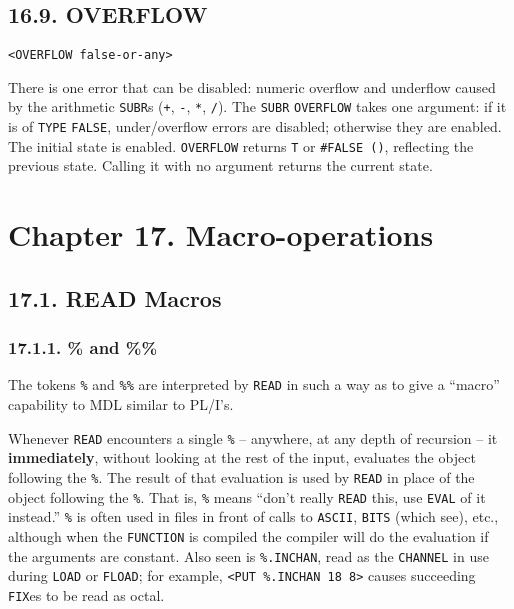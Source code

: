 \documentclass[a4paper,]{article}
\begin{document}
\subsection{16.9. OVERFLOW}\label{overflow}

\begin{verbatim}
<OVERFLOW false-or-any>
\end{verbatim}

 There is one error that can be disabled: numeric overflow and underflow caused by the
arithmetic \texttt{SUBR}s (\texttt{+}\index{\texttt{+}}, \texttt{-}\index{\texttt{-}}, \texttt{*}, \index{\texttt{*}}
\texttt{/}\index{\texttt{/}}). The \texttt{SUBR} \texttt{OVERFLOW} takes one argument: if it is of \texttt{TYPE}
\texttt{FALSE}, under/overflow errors are disabled; otherwise they are enabled. The initial state is enabled.
\texttt{OVERFLOW} returns \texttt{T} or \texttt{\#FALSE\ ()}, reflecting the previous state. Calling it with no argument
returns the current state.

\section{Chapter 17. Macro-operations}\label{chapter-17.-macro-operations}

\subsection{17.1. READ Macros}\label{read-macros}

\subsubsection{17.1.1. \% and \%\%}\label{and}

The tokens \texttt{\%}  and \texttt{\%\%}  are interpreted by
\texttt{READ} in such a way as to give a ``macro'' capability to MDL similar to PL/I's.

Whenever \texttt{READ} encounters a single \texttt{\%} -- anywhere, at any depth of recursion -- it \textbf{immediately},
without looking at the rest of the input, evaluates the object following the \texttt{\%}. The result of that evaluation is
used by \texttt{READ} in place of the object following the \texttt{\%}. That is, \texttt{\%} means ``don't really
\texttt{READ} this, use \texttt{EVAL} of it instead.'' \texttt{\%} is often used in files in front of calls to
\texttt{ASCII}, \texttt{BITS} (which see), etc., although when the \texttt{FUNCTION} is compiled the compiler will do the
evaluation if the arguments are constant. Also seen is \texttt{\%.INCHAN}, read as the \texttt{CHANNEL} in use during
\texttt{LOAD} or \texttt{FLOAD}; for example, \texttt{\textless{}PUT\ \%.INCHAN\ 18\ 8\textgreater{}} causes succeeding
\texttt{FIX}es to be read as octal.
\end{document}
